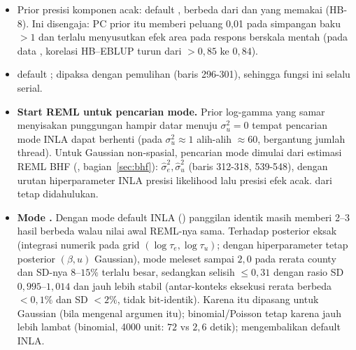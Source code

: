 \begin{itemize}
  \item Prior presisi komponen acak:  default
        , berbeda dari  dan
         yang memakai  (HB-8). Ini
        disengaja: PC prior itu memberi peluang 0,01 pada simpangan baku
        $>1$ dan terlalu menyusutkan efek area pada respons berskala mentah
        (pada data , korelasi HB--EBLUP turun dari $>0{,}85$
        ke $0{,}84$).
  \item {} default ;  dipaksa
         dengan pemulihan  (baris 296-301),
        sehingga fungsi ini selalu serial.
  \item \textbf{Start REML untuk pencarian mode.} Prior log-gamma yang samar
        menyisakan punggungan hampir datar menuju $\sigma_u^2=0$ tempat
        pencarian mode INLA dapat berhenti (pada 
        $\sigma_u^2\approx1$ alih-alih $\approx60$, bergantung jumlah
        thread). Untuk Gaussian non-spasial, pencarian mode dimulai dari
        estimasi REML BHF (, bagian~\ref{sec:bhf}):
        $\hat\sigma_e^2,\hat\sigma_u^2$
        (baris 312-318,  539-548), dengan urutan
        hiperparameter INLA presisi likelihood lalu presisi efek acak.
         dari  tetap didahulukan.
  \item \textbf{Mode .} Dengan mode default INLA
        () panggilan identik masih memberi 2--3 hasil berbeda
        walau nilai awal REML-nya sama. Terhadap posterior eksak (integrasi
        numerik pada grid $(\log\tau_e,\log\tau_u)$; dengan hiperparameter
        tetap posterior $(\beta,u)$ Gaussian), mode  meleset
        sampai $2{,}0$ pada rerata county dan SD-nya $8$--$15\%$ terlalu besar,
        sedangkan  selisih $\le0{,}31$ dengan rasio SD
        $0{,}995$--$1{,}014$ dan jauh lebih stabil (antar-konteks eksekusi
        rerata berbeda $<0{,}1\%$ dan SD $<2\%$, tidak bit-identik). Karena itu  dipasang untuk Gaussian (bila  mengenal argumen itu);
        binomial/Poisson tetap  karena  jauh lebih lambat
        (binomial, 4000 unit: $72$ vs $2{,}6$ detik);
         mengembalikan default INLA.

\end{itemize}
